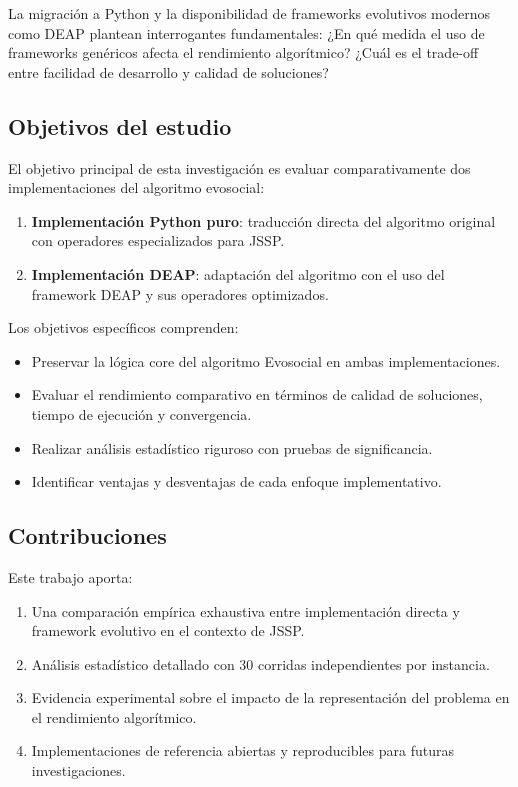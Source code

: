 \documentclass[12pt,a4paper]{article}
\begin{document}
La migración a Python y la disponibilidad de frameworks evolutivos modernos como DEAP \cite{fortin2012deap} plantean interrogantes fundamentales: ¿En qué medida el uso de frameworks genéricos afecta el rendimiento algorítmico? ¿Cuál es el trade-off entre facilidad de desarrollo y calidad de soluciones?

\subsection{Objetivos del estudio}

El objetivo principal de esta investigación es evaluar comparativamente dos implementaciones del algoritmo evosocial:

\begin{enumerate}
    \item \textbf{Implementación Python puro}: traducción directa del algoritmo original con operadores especializados para JSSP.
    \item \textbf{Implementación DEAP}: adaptación del algoritmo con el uso del framework DEAP y sus operadores optimizados.
\end{enumerate}

Los objetivos específicos comprenden:

\begin{itemize}
    \item Preservar la lógica core del algoritmo Evosocial en ambas implementaciones.
    \item Evaluar el rendimiento comparativo en términos de calidad de soluciones, tiempo de ejecución y convergencia.
    \item Realizar análisis estadístico riguroso con pruebas de significancia.
    \item Identificar ventajas y desventajas de cada enfoque implementativo.
\end{itemize}

\subsection{Contribuciones}

Este trabajo aporta:

\begin{enumerate}
    \item Una comparación empírica exhaustiva entre implementación directa y framework evolutivo en el contexto de JSSP.
    \item Análisis estadístico detallado con 30 corridas independientes por instancia.
    \item Evidencia experimental sobre el impacto de la representación del problema en el rendimiento algorítmico.
    \item Implementaciones de referencia abiertas y reproducibles para futuras investigaciones.
\end{enumerate}
\end{document}
